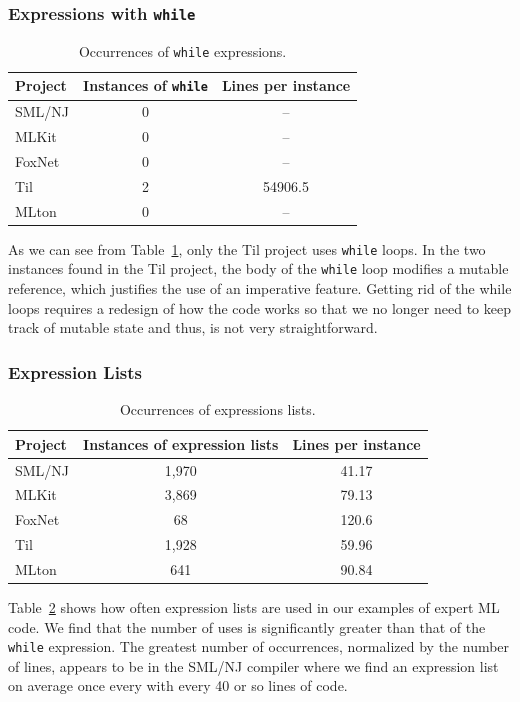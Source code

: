 \documentclass[12pt,abstracton]{scrartcl}
\begin{document}
\subsubsection{Expressions with \texttt{while}}
\begin{table}[h!]
\centering
\begin{tabular}{|l||c|c|}
\hline
Project & Instances of \texttt{while} & Lines per instance \\ \hline\hline
SML/NJ & 0 & --\\
MLKit & 0 & --\\
FoxNet & 0 & -- \\
Til & 2 & 54906.5 \\
MLton & 0 & --\\ \hline
\end{tabular}
\caption{Occurrences of \texttt{while} expressions.}
\label{table:while}
\end{table}
As we can see from Table~\ref{table:while}, only the Til
project uses \texttt{while} loops.
In the two instances found in the Til project, the body of the \texttt{while}
loop modifies a mutable reference, which justifies the use of
an imperative feature. Getting rid of the while loops requires a redesign of how the code works so
that we no longer need to keep track of mutable state and thus, is not very straightforward.
\subsubsection{Expression Lists}
\begin{table}[h!]
\centering
\begin{tabular}{|l||c|c|}
\hline
Project & Instances of expression lists & Lines per instance \\ \hline\hline
SML/NJ & 1,970 & 41.17 \\
MLKit & 3,869 & 79.13 \\
FoxNet & 68 & 120.6 \\
Til & 1,928 & 59.96 \\
MLton & 641 & 90.84 \\ \hline
\end{tabular}
\caption{Occurrences of expressions lists.}
\label{table:explist}
\end{table}
Table~\ref{table:explist} shows how often expression lists are used in our
examples of expert ML code. We find that the number of uses is significantly
greater than that of the \texttt{while} expression. The greatest number
of occurrences, normalized by the number of lines, appears to be in the SML/NJ
compiler where we find an expression list on average once every with every
40 or so lines of code.
\end{document}

